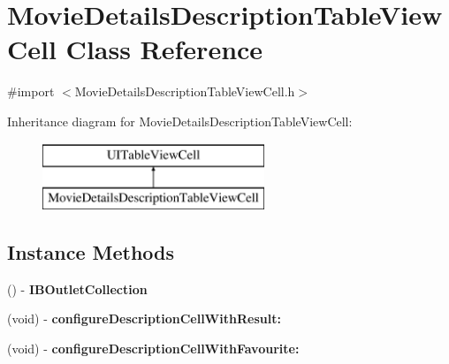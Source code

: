 \section{Movie\+Details\+Description\+Table\+View\+Cell Class Reference}
\label{interface_movie_details_description_table_view_cell}


{\ttfamily \#import $<$Movie\+Details\+Description\+Table\+View\+Cell.\+h$>$}

Inheritance diagram for Movie\+Details\+Description\+Table\+View\+Cell\+:\begin{figure}[H]
\begin{center}
\leavevmode
\includegraphics[height=2.000000cm]{interface_movie_details_description_table_view_cell}
\end{center}
\end{figure}
\subsection*{Instance Methods}
\begin{DoxyCompactItemize}
\item 
() -\/ {\bfseries I\+B\+Outlet\+Collection}\label{interface_movie_details_description_table_view_cell_a09f70273b62334127a5159a53f2916de}

\item 
(void) -\/ {\bf configure\+Description\+Cell\+With\+Result\+:}
\item 
(void) -\/ {\bf configure\+Description\+Cell\+With\+Favourite\+:}
\end{DoxyCompactItemize}
